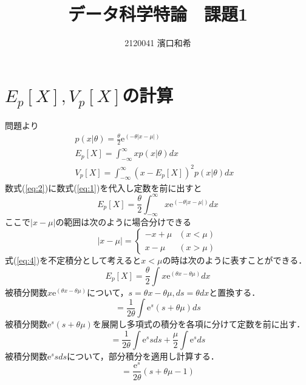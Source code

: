 \documentclass[uplatex,b5j]{jsarticle} %
\begin{document}
\title{データ科学特論　課題1}
\author{2120041 濱口和希}
\maketitle                      %

\section{$E_p[X], V_p[X]$の計算}
問題より
\begin{eqnarray}
    p(x|\theta)=\frac{\theta}{2}\mathrm{e}^{(-\theta|x-\mu|)} \label{eq:1} & \\
    E_p[X]=\int_{-\infty}^{\infty}xp(x|\theta)dx \label{eq:2} & \\
    V_p[X]=\int_{-\infty}^{\infty}(x-E_p[X])^2p(x|\theta)dx & \label{eq:3}
\end{eqnarray}
数式(\ref{eq:2})に数式(\ref{eq:1})を代入し定数を前に出すと
\begin{equation}
    E_p[X]=\frac{\theta}{2}\int_{-\infty}^{\infty}x\mathrm{e}^{(-\theta|x-\mu|)}dx \label{eq:4}
\end{equation}
ここで$|x-\mu|$の範囲は次のように場合分けできる
\begin{equation}\label{eq:5}
    |x-\mu| = \begin{cases}
    -x+\mu & (x<\mu) \\
     x-\mu & (x>\mu)
    \end{cases}
\end{equation}
式(\ref{eq:4})を不定積分として考えると$x<\mu$の時は次のように表すことができる．
\begin{equation}
    E_p[X]=\frac{\theta}{2}\int x\mathrm{e}^{(\theta x -\theta \mu)} dx \label{eq:6}
\end{equation}
被積分関数$x\mathrm{e}^{(\theta x -\theta \mu)}$について，$s=\theta x -\theta \mu, ds=\theta dx$と置換する．
\begin{equation}
    =\frac{1}{2\theta}\int \mathrm{e}^{s}(s+\theta \mu) ds \label{eq:7}
\end{equation}
被積分関数$\mathrm{e}^{s}(s+\theta \mu)$を展開し多項式の積分を各項に分けて定数を前に出す．
\begin{equation}
    =\frac{1}{2\theta}\int \mathrm{e}^{s}s ds + \frac{\mu}{2}\int \mathrm{e}^{s} ds \label{eq:8}
\end{equation}
被積分関数$\mathrm{e}^{s}s ds$について，部分積分を適用し計算する．
\begin{equation}
    =\frac{\mathrm{e}^{s}}{2\theta}(s+\theta\mu-1) \label{eq:9}
\end{equation}
\end{document}
